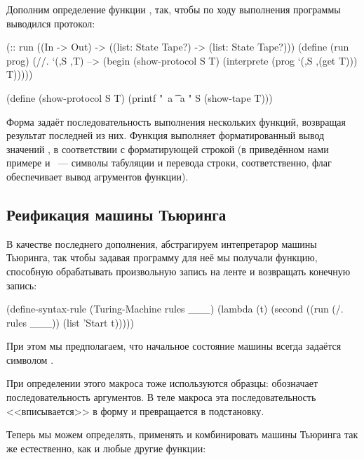 Дополним определение функции , так, чтобы по ходу выполнения программы выводился протокол:
\begin{Definition}[emph={S,T,prog}]
(:: run ((In -> Out) -> ((list: State Tape?) -> 
                         (list: State Tape?)))
 (define (run prog)
   (//. `(,S ,T) --> (begin
                       (show-protocol S T)
                       (interprete (prog `(,S ,(get T))) T)))))%

(define (show-protocol S T)
  (printf "~a \t ~a \n" S (show-tape T)))
\end{Definition}

Форма  задаёт последовательность выполнения нескольких функций, возвращая результат последней из них. Функция  выполняет форматированный вывод значений , в соответствии с форматирующей строкой  (в приведённом нами примере  и ~--- символы табуляции и перевода строки, соответственно, флаг  обеспечивает вывод агрументов функции).

\subsection*{Реификация машины Тьюринга}
В качестве последнего дополнения, абстрагируем интепретарор машины Тьюринга, так чтобы задавая программу для неё мы получали функцию, способную обрабатывать произвольную запись на ленте и возвращать конечную запись:

\begin{Definition}[emph={l,rules}]
(define-syntax-rule (Turing-Machine rules ___)
  (lambda (t)
    (second ((run (/. rules ___)) (list 'Start t)))))
\end{Definition}

\noindent При этом мы предполагаем, что начальное состояние машины всегда задаётся символом . 

При определении этого макроса тоже используются образцы:  обозначает последовательность аргументов. В теле макроса эта последовательность <<вписывается>> в форму  и превращается в подстановку.

Теперь мы можем определять, применять и комбинировать машины Тьюринга так же естественно, как и любые другие функции:

